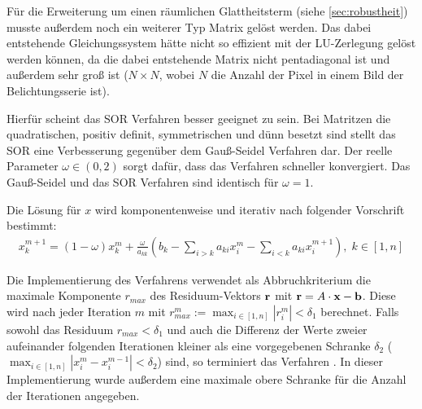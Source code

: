 Für die Erweiterung um einen räumlichen Glattheitsterm (siehe \autoref{sec:robustheit}) musste außerdem noch ein weiterer Typ Matrix gelöst werden. Das dabei entstehende Gleichungssystem hätte nicht so effizient mit der LU-Zerlegung gelöst werden können, da die dabei entstehende Matrix nicht pentadiagonal ist und außerdem sehr groß ist ($N \times N$, wobei $N$ die Anzahl der Pixel in einem Bild der Belichtungsserie ist). 

Hierfür scheint das \gls{SOR} Verfahren besser geeignet zu sein. Bei Matritzen die quadratischen, positiv definit, symmetrischen und dünn besetzt sind stellt das \gls{SOR} eine Verbesserung gegenüber dem Gauß-Seidel Verfahren dar. Der reelle Parameter $\omega \in (0,2)$ sorgt dafür, dass das Verfahren schneller konvergiert. Das Gauß-Seidel und das \gls{SOR} Verfahren sind identisch für $\omega = 1 $.

Die Lösung für $x$ wird komponentenweise und iterativ nach folgender Vorschrift bestimmt:
\begin{align}
x_k^{m+1} = (1-\omega)x_k^m+ \frac{\omega}{a_{kk}}(b_k - \sum_{i>k} a_{ki}x_i^m - \sum_{i<k} a_{ki}x_{i}^{m+1}) ,\; k \in [1, n]
\end{align}

Die Implementierung des Verfahrens verwendet als Abbruchkriterium die maximale Komponente $r_{max}$ des Residuum-Vektors $\mathbf r$ mit $\mathbf r = A \cdot \mathbf x - \mathbf b$. Diese wird nach jeder Iteration $m$ mit $r_{max}^m := \max_{i\in [1,n]} |r_i^m| < \delta_1$ berechnet. Falls sowohl das Residuum $r_{max} < \delta_1$ und auch die Differenz der Werte zweier aufeinander folgenden Iterationen kleiner als eine vorgegebenen Schranke $\delta_2$ ($\max_{i\in [1,n]} |x_i^m - x_i^{m-1}| < \delta_2$) sind, so terminiert das Verfahren \cite[S. 143]{Westermann2008}. In dieser Implementierung wurde außerdem eine maximale obere Schranke für die Anzahl der Iterationen angegeben.


